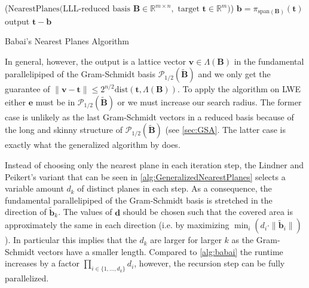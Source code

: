 \begin{algorithm2e}
  \Begin($\text{NearestPlanes} {(}\text{LLL-reduced basis }\mathbf{B} \in \mathbb{R}^{m \times n},\text{ target }\mathbf{t}\in \mathbb{R}^{m}{)}$)
  {
    $\mathbf{b} = \pi_{\text{span}(\mathbf{B})}(\mathbf{t})$\\
    output $\mathbf{t} - \mathbf{b}$\\
  }
  \caption{Babai's Nearest Planes Algorithm \cite{Bab85}}\label{alg:babai} %
\end{algorithm2e}

In general, however, the output is a lattice vector $\mathbf{v} \in \Lambda(\mathbf{B})$ in the fundamental parallelipiped of the Gram-Schmidt basis $\mathcal{P}_{1/2}(\tilde{\mathbf{B}})$ and we only get the guarantee of $\|\mathbf{v} - \mathbf{t}\| \leq 2^{n/2} \text{dist}(\mathbf{t}, \Lambda(\mathbf{B}))$. To apply the algorithm on LWE either $\mathbf{e}$ must be in $\mathcal{P}_{1/2}(\tilde{\mathbf{B}})$ or we must increase our search radius. The former case is unlikely as the last Gram-Schmidt vectors in a reduced basis because of the long and skinny structure of $\mathcal{P}_{1/2}(\tilde{\mathbf{B}})$ (see \cref{sec:GSA}. The latter case is exactly what the generalized algorithm by \cite{LP11} does.

Instead of choosing only the nearest plane in each iteration step, the Lindner and Peikert's variant that can be seen in \cref{alg:GeneralizedNearestPlanes} selects a variable amount $d_k$ of distinct planes in each step. As a consequence, the fundamental parallelipiped of the Gram-Schmidt basis is stretched in the direction of $\tilde{\mathbf{b}}_k$. The values of $\mathbf{d}$ should be chosen such that the covered area is approximately the same in each direction (i.e. by maximizing $\min_i(d_i \cdot \|\tilde{\mathbf{b}}_i\|)$). In particular this implies that the $d_k$ are larger for larger $k$ as the Gram-Schmidt vectors have a smaller length. %
Compared to \cref{alg:babai} the runtime increases by a factor $\prod_{i \in \{1, \dots, d_k\}} d_i$, however, the recursion step can be fully parallelized.

